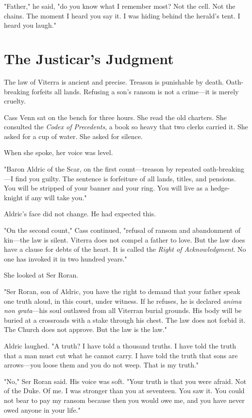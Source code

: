 \documentclass[11pt,twoside]{book}
\begin{document}
"Father," he said, "do you know what I remember most? Not the cell. Not the chains. The moment I heard you say it. I was hiding behind the herald's tent. I heard you laugh."

\section{The Justicar's Judgment}

The law of Viterra is ancient and precise. Treason is punishable by death. Oath-breaking forfeits all lands. Refusing a son's ransom is not a crime---it is merely cruelty.

Cass Venn sat on the bench for three hours. She read the old charters. She consulted the \textit{Codex of Precedents}, a book so heavy that two clerks carried it. She asked for a cup of water. She asked for silence.

When she spoke, her voice was level.

"Baron Aldric of the Scar, on the first count---treason by repeated oath-breaking---I find you guilty. The sentence is forfeiture of all lands, titles, and pensions. You will be stripped of your banner and your ring. You will live as a hedge-knight if any will take you."

Aldric's face did not change. He had expected this.

"On the second count," Cass continued, "refusal of ransom and abandonment of kin---the law is silent. Viterra does not compel a father to love. But the law does have a clause for debts of the heart. It is called the \textit{Right of Acknowledgment}. No one has invoked it in two hundred years."

She looked at Ser Roran.

"Ser Roran, son of Aldric, you have the right to demand that your father speak one truth aloud, in this court, under witness. If he refuses, he is declared \textit{anima non grata}---his soul outlawed from all Viterran burial grounds. His body will be buried at a crossroads with a stake through his chest. The law does not forbid it. The Church does not approve. But the law is the law."

Aldric laughed. "A truth? I have told a thousand truths. I have told the truth that a man must cut what he cannot carry. I have told the truth that sons are arrows---you loose them and you do not weep. That is my truth."

"No," Ser Roran said. His voice was soft. "Your truth is that you were afraid. Not of the Duke. Of me. I was stronger than you at seventeen. You saw it. You could not bear to pay my ransom because then you would owe me, and you have never owed anyone in your life."
\end{document}
